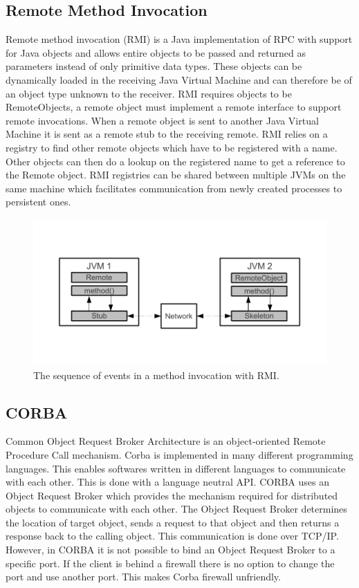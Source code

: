 \subsection{Remote Method Invocation}
Remote method invocation (RMI) is a Java implementation of RPC with support for Java objects and allows entire objects to be passed and returned as parameters instead of only primitive data types. These objects can be dynamically loaded in the receiving Java Virtual Machine and can therefore be of an object type unknown to the receiver. RMI requires objects to be RemoteObjects, a remote object must implement a remote interface to support remote invocations. When a remote object is sent to another Java Virtual Machine it is sent as a remote stub to the receiving remote.
RMI relies on a registry to find other remote objects which have to be registered with a name. Other objects can then do a lookup on the registered name to get a reference to the Remote object. RMI registries can be shared between multiple JVMs on the same machine which facilitates communication from newly created processes to persistent ones.

\begin{figure}[ht]
	\centering
    	\includegraphics{part_2/remote_procedure_calls/rmi.pdf}
		\caption{The sequence of events in a method invocation with RMI.}
		\label{rmi} 
\end{figure}

\subsection{CORBA}
Common Object Request Broker Architecture is an object-oriented Remote Procedure Call mechanism. Corba is implemented in many different programming languages. This enables softwares written in different languages to communicate with each other. This is done with a language neutral API. CORBA uses an Object Request Broker which provides the mechanism required for distributed objects to communicate with each other. The Object Request Broker determines the location of target object, sends a request to that object and then returns a response back to the calling object. This communication is done over TCP/IP. However, in CORBA it is not possible to bind an Object Request Broker to a specific port. If the client is behind a firewall there is no option to change the port and use another port. This makes Corba firewall unfriendly.
